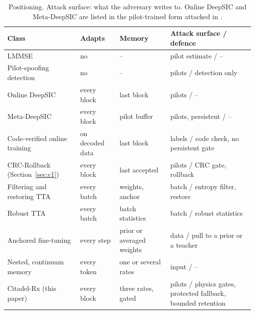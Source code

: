 \documentclass[journal]{IEEEtran}
\theoremstyle{remark}
\begin{document}
\begin{table}[t]
\centering\caption{Positioning. Attack surface: what the adversary writes to. Online DeepSIC and Meta-DeepSIC are listed in the pilot-trained form attacked in \cite{wu2024}.}\label{tab:pos}
\scriptsize
\begin{tabular}{@{}L{23mm}L{12mm}L{15mm}L{29mm}@{}}
\toprule
Class & Adapts & Memory & Attack surface / defence\\
\midrule
LMMSE & no & -- & pilot estimate / --\\
Pilot-spoofing detection \cite{kapetanovic2013,tugnait2015} & no & -- & pilots / detection only\\
Online DeepSIC \cite{shlezinger2021} & every block & last block & pilots / --\\
Meta-DeepSIC \cite{raviv2023} & every block & pilot buffer & pilots, persistent / --\\
Code-verified online training \cite{viterbinet2020,schibisch2018} & on decoded data & last block & labels / code check, no persistent gate\\
CRC-Rollback (Section~\ref{sec:c1}) & every block & last accepted & pilots / CRC gate, rollback\\
Filtering and restoring TTA \cite{eata2022,cotta2022,sar2023,rotta2023} & every batch & weights, anchor & batch / entropy filter, restore\\
Robust TTA \cite{medbn,wu2023tta} & every batch & batch statistics & batch / robust statistics\\
Anchored fine-tuning \cite{l2sp2018,ewc2017,meanteacher2017} & every step & prior or averaged weights & data / pull to a prior or a teacher\\
Nested, continuum memory \cite{behrouz2025nested,behrouz2025titans} & every token & one or several rates & input / --\\
Citadel-Rx (this paper) & every block & three rates, gated & pilots / physics gates, protected fallback, bounded retention\\
\bottomrule
\end{tabular}
\end{table}
\end{document}
